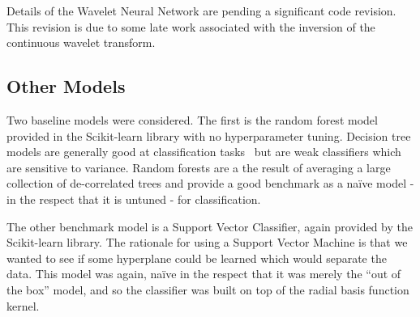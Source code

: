 Details of the Wavelet Neural Network are pending a significant code revision.
This revision is due to some late work associated with the inversion of the continuous wavelet transform.

\subsection{Other Models} \label{other models}
Two baseline models were considered.
The first is the random forest model provided in the Scikit-learn library with no hyperparameter tuning.
Decision tree models are generally good at classification tasks~\cite{hastie01statisticallearning} but are weak classifiers which are sensitive to variance.
Random forests are a the result of averaging a large collection of de-correlated trees and provide a good benchmark as a na\"ive model - in the respect that it is untuned - for classification.

The other benchmark model is a Support Vector Classifier, again provided by the Scikit-learn library.
The rationale for using a Support Vector Machine is that we wanted to see if some hyperplane could be learned which would separate the data.
This model was again, na\"ive in the respect that it was merely the ``out of the box'' model, and so the classifier was built on top of the radial basis function kernel.
